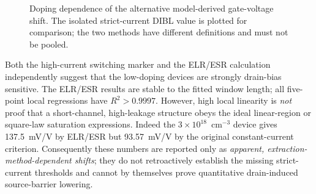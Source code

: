 \begin{figure}[H]\centering
{}
\caption{Doping dependence of the alternative
model-derived gate-voltage shift. The isolated strict-current
DIBL value is plotted for comparison; the two methods
have different definitions and must not be pooled.}
\end{figure}

Both the high-current switching marker and the ELR/ESR
calculation independently suggest that the low-doping
devices are strongly drain-bias sensitive. The ELR/ESR
results are stable to the fitted window length; all
five-point local regressions have $R^2>0.9997$.
However, high local linearity is \emph{not} proof that
a short-channel, high-leakage structure obeys the
ideal linear-region or square-law saturation expressions.
Indeed the $3\times10^{18}$~cm$^{-3}$ device gives
137.5~mV/V by ELR/ESR but 93.57~mV/V by the
original constant-current criterion. Consequently
these numbers are reported only as
\emph{apparent, extraction-method-dependent shifts};
they do not retroactively establish the missing strict-current
thresholds and cannot by themselves prove quantitative
drain-induced source-barrier lowering.

